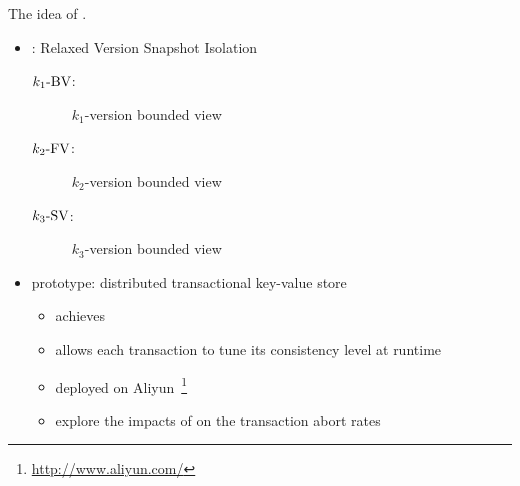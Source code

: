 \begin{frame}{}
  The idea of .

  \vspace{0.50cm}
  \begin{itemize}
    \setlength{\itemsep}{10pt}
    \item \rvsi{}: Relaxed Version Snapshot Isolation
      \begin{description}
	\item[$k_1\text{-BV}$:] $k_1$-version bounded \emph{} view
	\item[$k_2\text{-FV}$:] $k_2$-version bounded \emph{} view
	\item[$k_3\text{-SV}$:] $k_3$-version bounded \emph{} view
      \end{description}
    \pause
    \item \chameleon{} prototype: distributed transactional key-value store
      \begin{itemize}
	\item achieves \rvsi{}
	\item allows each transaction to tune its consistency level at runtime
	  \pause
	\item deployed on Aliyun~\footnote{\url{http://www.aliyun.com/}}
	\item explore the impacts of \rvsi{} on the transaction abort rates
      \end{itemize}
  \end{itemize}
\end{frame}
